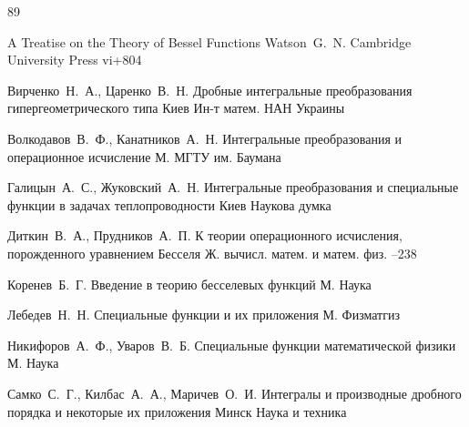 \begin{thebibliography}{89}

\book A Treatise on the Theory of Bessel Functions
\by Watson~G.~N.
\publaddr Cambridge
\publ University Press
\totalpages vi+804


\by Вирченко~Н.~А., Царенко~В.~Н. 
\book Дробные интегральные преобразования гипергеометрического типа
\publaddr Киев
\publ Ин-т матем. НАН Украины




\by Волкодавов~В.~Ф., Канатников~А.~Н. 
\book Интегральные преобразования и операционное исчисление
\publaddr М.
\publ МГТУ им. Баумана

\by Галицын~А.~С., Жуковский~А.~Н.
\book Интегральные преобразования и специальные функции в задачах теплопроводности
\publaddr Киев
\publ Наукова думка

\by Диткин~В.~А., Прудников~А.~П.
\paper К теории операционного исчисления, порожденного уравнением Бесселя
\jour Ж. вычисл. матем. и матем. физ.
--238

\by Коренев~Б.~Г. 
\book Введение в теорию бесселевых функций
\publaddr М.
\publ Наука


\by Лебедев~Н.~Н.
\book Специальные функции и их приложения
\publaddr М.
\publ Физматгиз

\by Никифоров~А.~Ф., Уваров~В.~Б.
\book Специальные функции математической физики
\publaddr М.
\publ Наука



\by Самко~С.~Г., Килбас~А.~А., Маричев~О.~И. 
\book Интегралы и производные дробного порядка и некоторые их приложения
\publaddr Минск
\publ Наука и техника
%




\end{thebibliography}
